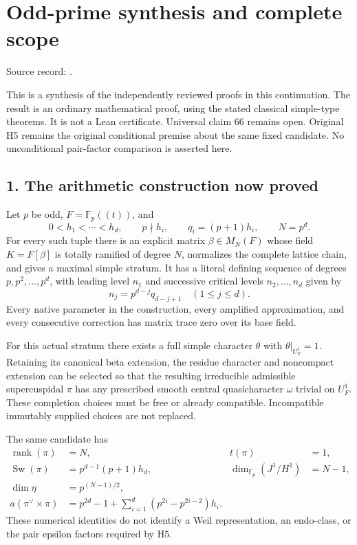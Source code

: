 \clearpage
\section{Odd-prime synthesis and complete scope}\label{app:odd_synthesis}

Source record: .

This is a synthesis of the independently reviewed proofs in this
continuation. The result is an ordinary mathematical proof, using the
stated classical simple-type theorems. It is not a Lean certificate.
Universal claim 66 remains open. Original H5 remains the original conditional premise about the same fixed candidate. No unconditional pair-factor comparison is asserted here.

\hypertarget{odd_synthesis-the-arithmetic-construction-now-proved}{%
\subsection{1. The arithmetic construction now
proved}\label{odd_synthesis-the-arithmetic-construction-now-proved}}

Let \(p\) be odd, \(F=\mathbb F_p((t))\), and \[
0<h_1<\cdots<h_d,\qquad p\nmid h_i,\qquad
q_i=(p+1)h_i,\qquad N=p^d.
\] For every such tuple there is an explicit matrix \(\beta\in M_N(F)\)
whose field \(K=F[\beta]\) is totally ramified of degree \(N\),
normalizes the complete lattice chain, and gives a maximal simple
stratum. It has a literal defining sequence of degrees
\(p,p^2,\ldots,p^d\), with leading level \(n_1\) and successive critical
levels \(n_2,\ldots,n_d\) given by \[
n_j=p^{d-j}q_{d-j+1}\quad(1\le j\le d).
\] Every native parameter in the construction, every amplified
approximation, and every consecutive correction has matrix trace zero
over its base field.

For this actual stratum there exists a full simple character \(\theta\)
with \(\theta|_{U_F^1}=1\). Retaining its canonical beta extension, the
residue character and noncompact extension can be selected so that the
resulting irreducible admissible supercuspidal \(\pi\) has any
prescribed smooth central quasicharacter \(\omega\) trivial on
\(U_F^1\). These completion choices must be free or already compatible. Incompatible immutably supplied choices are not replaced.

The same candidate has \[
\begin{aligned}
\operatorname{rank}(\pi)&=N, &t(\pi)&=1,\\
\operatorname{Sw}(\pi)&=p^{d-1}(p+1)h_d, &
\dim_{\mathbb F_p}(J^1/H^1)&=N-1,\\
\dim\eta&=p^{(N-1)/2},\\
a(\pi^\vee\times\pi)
 &=p^{2d}-1+\sum_{i=1}^d(p^{2i}-p^{2i-2})h_i.
\end{aligned}
\] These numerical identities do not identify a Weil representation, an
endo-class, or the pair epsilon factors required by H5.

